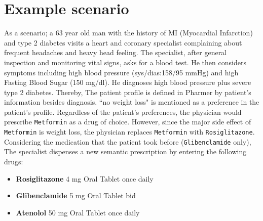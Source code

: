 \documentclass[conference]{IEEEtran}
\begin{document}
\section{Example scenario}
\label{sec:example}
As a scenario; a 63 year old man with the history of MI (Myocardial Infarction) and type 2 diabetes visits a heart and coronary specialist complaining about frequent headaches and heavy head feeling. The specialist, after general inspection and monitoring vital signs, asks for a blood test.
He then considers symptoms including high blood pressure (sys/dias:158/95 mmHg) and high Fasting Blood Sugar (150 mg/dl).
He diagnoses high blood pressure plus severe type 2 diabetes.
Thereby, The patient profile is defined in Pharmer by patient's information besides diagnosis.
``no weight loss" is mentioned as a preference in the patient's profile.
Regardless of the patient's preferences, the physician would prescribe \texttt{Metformin} as a drug of choice.
However, since the major side effect of \texttt{Metformin} is weight loss, the physician replaces \texttt{Metformin} with \texttt{Rosiglitazone}.
Considering the medication that the patient took before (\texttt{Glibenclamide} only), The specialist dispenses a new semantic prescription by entering the following drugs:

\begin{itemize}
\item \textbf{Rosiglitazone} 4 mg Oral Tablet once daily
\item \textbf{Glibenclamide} 5 mg Oral Tablet bid
\item \textbf{Atenolol} 50 mg Oral Tablet once daily
\end{itemize}
\end{document}
